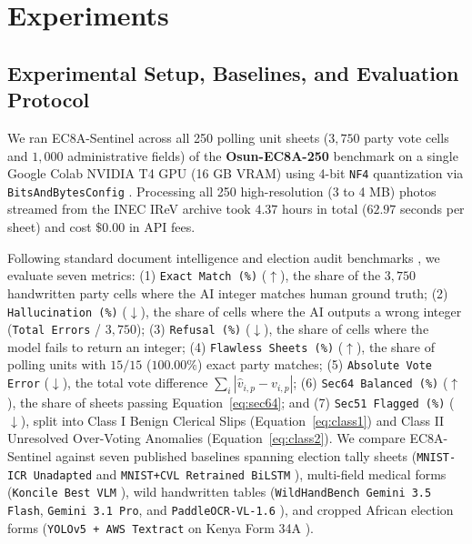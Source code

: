 \documentclass{article}
\begin{document}
\section{Experiments}

\subsection{Experimental Setup, Baselines, and Evaluation Protocol}

We ran EC8A-Sentinel across all 250 polling unit sheets ($3,750$ party vote cells and $1,000$ administrative fields) of the \textbf{Osun-EC8A-250} benchmark on a single Google Colab NVIDIA T4 GPU (16 GB VRAM) using 4-bit \texttt{NF4} quantization via \texttt{BitsAndBytesConfig} \cite{dettmers2023qlora}. Processing all 250 high-resolution (3 to 4 MB) photos streamed from the INEC IReV archive took $4.37$ hours in total ($62.97$ seconds per sheet) and cost $\$0.00$ in API fees.

Following standard document intelligence and election audit benchmarks \cite{gondere2016election,zhang2026wildhandbench,kimani2022using}, we evaluate seven metrics: (1) \texttt{Exact Match (\%)} ($\uparrow$), the share of the $3,750$ handwritten party cells where the AI integer matches human ground truth; (2) \texttt{Hallucination (\%)} ($\downarrow$), the share of cells where the AI outputs a wrong integer (\texttt{Total Errors} / $3,750$); (3) \texttt{Refusal (\%)} ($\downarrow$), the share of cells where the model fails to return an integer; (4) \texttt{Flawless Sheets (\%)} ($\uparrow$), the share of polling units with $15/15$ ($100.00\%$) exact party matches; (5) \texttt{Absolute Vote Error} ($\downarrow$), the total vote difference $\sum_i |\hat{v}_{i,p} - v_{i,p}|$; (6) \texttt{Sec64 Balanced (\%)} ($\uparrow$), the share of sheets passing Equation~\ref{eq:sec64}; and (7) \texttt{Sec51 Flagged (\%)} ($\downarrow$), split into Class I Benign Clerical Slips (Equation~\ref{eq:class1}) and Class II Unresolved Over-Voting Anomalies (Equation~\ref{eq:class2}). We compare EC8A-Sentinel against seven published baselines spanning election tally sheets (\texttt{MNIST-ICR Unadapted} and \texttt{MNIST+CVL Retrained BiLSTM} \cite{gondere2016election}), multi-field medical forms (\texttt{Koncile Best VLM} \cite{koncile2025ocr}), wild handwritten tables (\texttt{WildHandBench Gemini 3.5 Flash}, \texttt{Gemini 3.1 Pro}, and \texttt{PaddleOCR-VL-1.6} \cite{zhang2026wildhandbench}), and cropped African election forms (\texttt{YOLOv5 + AWS Textract} on Kenya Form 34A \cite{kimani2022using}).
\end{document}
